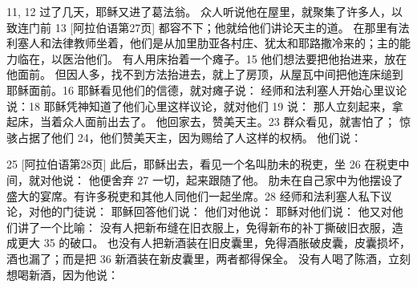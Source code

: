 11, 12  过了几天，耶稣又进了葛法翁。 众人听说他在屋里，就聚集了许多人，以致连门前 13 [阿拉伯语第27页] 都容不下；他就给他们讲论天主的道。 在那里有法利塞人和法律教师坐着，他们是从加里肋亚各村庄、犹太和耶路撒冷来的；主的能力临在，以医治他们。 有人用床抬着一个瘫子。15 他们想法要把他抬进来，放在他面前。 但因人多，找不到方法抬进去，就上了房顶，从屋瓦中间把他连床缒到耶稣面前。16  耶稣看见他们的信德，就对瘫子说： 经师和法利塞人开始心里议论说：18  耶稣凭神知道了他们心里这样议论，就对他们 19 说： 那人立刻起来，拿起床，当着众人面前出去了。 他回家去，赞美天主。23  群众看见，就害怕了； 惊骇占据了他们 24，他们赞美天主，因为赐给了人这样的权柄。 他们说：\par

25 [阿拉伯语第28页]  此后，耶稣出去，看见一个名叫肋未的税吏，坐 26 在税吏中间，就对他说： 他便舍弃 27 一切，起来跟随了他。 肋未在自己家中为他摆设了盛大的宴席。有许多税吏和其他人同他们一起坐席。28  经师和法利塞人私下议论，对他的门徒说： 耶稣回答他们说： 他们对他说： 耶稣对他们说： 他又对他们讲了一个比喻： 没有人把新布缝在旧衣服上，免得新布的补丁撕破旧衣服，造成更大 35 的破口。 也没有人把新酒装在旧皮囊里，免得酒胀破皮囊，皮囊损坏，酒也漏了；而是把 36 新酒装在新皮囊里，两者都得保全。 没有人喝了陈酒，立刻想喝新酒，因为他说：\par


